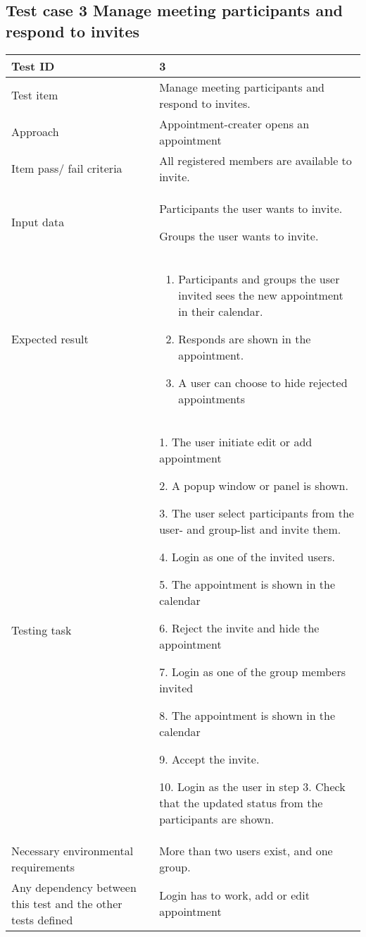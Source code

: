 \documentclass[a4paper, english, 12pt]{article}
\begin{document}
\subsection{Test case 3 Manage meeting participants and respond to invites}

\begin{tabularx}{\textwidth}{ |X|X| }
\hline
\rowcolor{Gray}
Test ID & 3 \\ \hline
Test item & Manage meeting participants and respond to invites. \\ \hline
Approach & Appointment-creater opens an appointment \\ \hline
Item pass/ fail criteria & All registered members are available to invite. \\ \hline
Input data & 
\begin{inputData}
	\item Participants the user wants to invite. 
	\item Groups the user wants to invite. 
\end{inputData}\\ \hline
Expected result & 
\begin{enumerate}
	\item Participants and groups the user invited sees the new appointment in their calendar.
	\item Responds are shown in the appointment.
	\item A user can choose to hide rejected appointments
\end{enumerate} \\ \hline
Testing task &
\begin{task steps}
	\item 1. The user initiate edit or add appointment
	\item 2. A popup window or panel is shown. 
	\item 3. The user select participants from the user- and group-list and invite them.
	\item 4. Login as one of the invited users. 
	\item 5. The appointment is shown in the calendar
	\item 6. Reject the invite and hide the appointment
	\item 7. Login as one of the group members invited
	\item 8. The appointment is shown in the calendar
	\item 9. Accept the invite.
	\item 10. Login as the user in step 3. Check that the updated status from the participants are shown. 
\end{task steps}	\\ \hline
Necessary environmental requirements & More than two users exist, and one group.   \\ \hline
Any dependency between this test and the other tests defined & Login has to work, add or edit appointment  \\ \hline

\end{tabularx}
\end{document}
